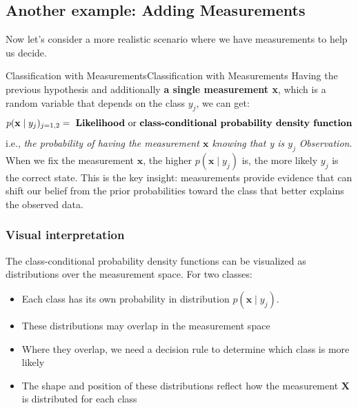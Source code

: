 \documentclass[a4paper]{article}
\theoremstyle{definition}
\begin{document}
\subsection{Another example: Adding Measurements}
Now let's consider a more realistic scenario where we have measurements to help us decide.
\begin{example}{Classification with Measurements}{Classification with Measurements}
Having the previous hypothesis and additionally \textbf{a single measurement x}, which is a random variable that depends 
on the class \( y_j \), we can get:
\[
  p(\mathbf{x} \;|\; y_j)_{j = 1,2} = \text{ \textbf{Likelihood} or \textbf{class-conditional probability density function}}
\]
i.e., \textit{the probability of having the measurement \( \mathbf{x} \) knowing that y is \( y_j \)}
\vspace{1em}
\noindent
\newline
\textit{Observation}. When we fix the measurement \( \mathbf{x} \), the higher \( p(\mathbf{x} \;|\; y_j) \) is, the more 
likely \( y_j \) is the correct state.
\vspace{1em}
\noindent
\newline
This is the key insight: measurements provide evidence that can shift our belief from the prior probabilities 
toward the class that better explains the observed data.
\end{example}
\subsubsection{Visual interpretation}
The class-conditional probability density functions can be visualized as distributions over the measurement space.
For two classes:
\begin{itemize}
    \item Each class has its own probability in distribution \( p(\mathbf{x} \;|\; y_j) \).
    \item These distributions may overlap in the measurement space 
    \item Where they overlap, we need a decision rule to determine which class is more likely 
    \item The shape and position of these distributions reflect how the measurement \( \mathbf{X} \) is distributed for each class
\end{itemize}
\end{document}
